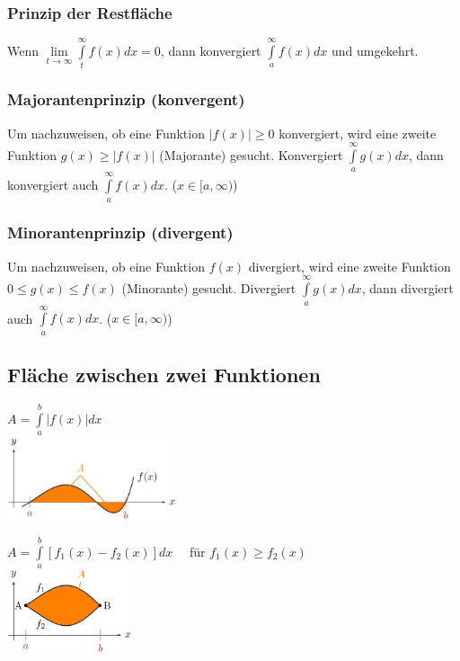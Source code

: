 	  
	    
	    
	\subsubsection{Prinzip der Restfl\"ache}
	  Wenn $\lim\limits_{t \rightarrow \infty} \int\limits^{\infty}_{t} f(x) dx = 0$, dann konvergiert
	  $\int\limits_a^{\infty} f(x) dx$ und umgekehrt.
	
	\subsubsection{Majorantenprinzip (konvergent)}
	  Um nachzuweisen, ob eine Funktion $|f(x)| \geq 0$ konvergiert, wird eine zweite
	  Funktion $g(x) \geq |f(x)|$ (Majorante) gesucht. Konvergiert $\int\limits_a^{\infty} g(x) dx$,
	  dann konvergiert auch $\int\limits_a^{\infty} f(x) dx$. ($x \in [a, \infty)$)
	
	\subsubsection{Minorantenprinzip (divergent)}
	  Um nachzuweisen, ob eine Funktion $f(x)$ divergiert, wird eine zweite
	  Funktion $0 \leq g(x) \leq f(x)$ (Minorante) gesucht. Divergiert
	  $\int\limits_a^{\infty} g(x) dx$,
	  dann divergiert auch $\int\limits_a^{\infty} f(x) dx$. ($x \in [a, \infty)$)
	  
	
	\subsection{Fläche zwischen zwei Funktionen {}}
		\begin{minipage}{.5\textwidth}
			$A=\int\limits_{a}^{b}|f(x)| d x$\\
			\includegraphics[height=2.5cm]{bilder/integral_flaeche1.png}
		\end{minipage}
		\begin{minipage}{.5\textwidth}
			$A=\int\limits_{a}^{b}\left[f_{1}(x)-f_{2}(x)\right] d x \quad$ für $f_{1}(x) \geq f_{2}(x)$\\
			\includegraphics[height=2.5cm]{bilder/integral_flaeche2.png}
		\end{minipage}
